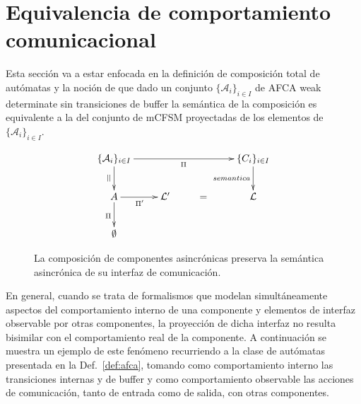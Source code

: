 \chapter{Equivalencia de comportamiento comunicacional}
\label{resultados}
Esta sección va a estar enfocada en la definición de composición total de autómatas y la noción de que dado un conjunto $\{ \mathcal{A}_i\}_{i \in I}$ de AFCA weak determinate sin transiciones de buffer la semántica de la composición es equivalente a la del conjunto de mCFSM proyectadas de los elementos de $\{ \mathcal{A}_i\}_{i \in I}$. 

\begin{figure}[ht]
\label{fig:equivalencia}
$$
\xymatrix{   
	\{\mathcal{A}_i\}_{i \in I} \ar[rrr]_{\Pi} \ar[d]_{||} & & & \{C_i\}_{i \in I}  \ar[d]_{semantica}  \\
	  {A} \ar[r]_{\Pi'} \ar[d]_{\Pi} & \mathcal{L}' & = & {\mathcal{L}}  \\
	  \emptyset
}
$$
\caption{La composición de componentes asincrónicas preserva la semántica asincrónica de su interfaz de comunicación.}
\label{fig:preservacion}
\end{figure}

En general, cuando se trata de formalismos que modelan simultáneamente aspectos del comportamiento interno de una componente y elementos de interfaz observable por otras componentes, la proyección de dicha interfaz no resulta bisimilar con el comportamiento real de la componente. A continuación se muestra un ejemplo de este fenómeno recurriendo a la clase de autómatas presentada en la Def.~\ref{def:afca}, tomando como comportamiento interno las transiciones internas y de buffer y como comportamiento observable las acciones de comunicación, tanto de entrada como de salida, con otras componentes.


